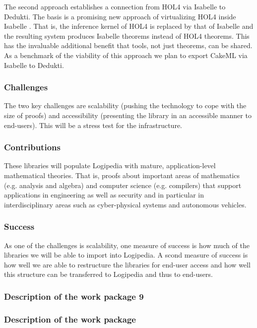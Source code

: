 The second approach establishes a connection from HOL4 via Isabelle to
Dedukti. The basis is a promising new approach of virtualizing HOL4
inside Isabelle \cite{ImmlerRW19}. That is, the inference
kernel of HOL4 is replaced by that of Isabelle and the resulting
system produces Isabelle theorems instead of HOL4 theorems. This has
the invaluable additional benefit that tools, not just theorems, can
be shared. As a benchmark of the viability of this approach we plan to
export CakeML via Isabelle to Dedukti.

\subsubsection*{Challenges}

The two key challenges are scalability (pushing the technology to cope
with the size of proofs) and accessibility (presenting the library in
an accessible manner to end-users). This will be a stress test for the
infrastructure.


\subsubsection*{Contributions}

These libraries will populate Logipedia with mature,
application-level mathematical theories. That is, proofs about
important areas of mathematics (e.g. analysis and algebra) and
computer science (e.g. compilers) that support applications in
engineering as well as security and in particular in interdisciplinary
areas such as cyber-physical systems and autonomous vehicles.

\subsubsection*{Success}

As one of the challenges is scalability, one measure of success is how
much of the libraries we will be able to import into Logipedia. A
scond measure of success is how well we are able to restructure the
libraries for end-user access and how well this structure can be
transferred to Logipedia and thus to end-users.


\subsubsection{Description of the work package 9}

\subsubsection{Description of the work package }

